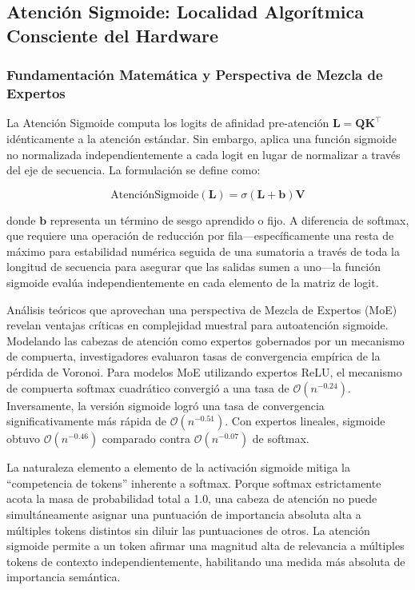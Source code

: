 \documentclass[11pt,a4paper]{article}
\begin{document}
\subsection{Atención Sigmoide: Localidad Algorítmica Consciente del Hardware}

\subsubsection{Fundamentación Matemática y Perspectiva de Mezcla de Expertos}

La Atención Sigmoide computa los logits de afinidad pre-atención $\mathbf{L} = \mathbf{Q}\mathbf{K}^\top$ idénticamente a la atención estándar. Sin embargo, aplica una función sigmoide no normalizada independientemente a cada logit en lugar de normalizar a través del eje de secuencia. La formulación se define como:

$$
\text{AtenciónSigmoide}(\mathbf{L}) = \sigma(\mathbf{L} + \mathbf{b}) \mathbf{V}
$$

donde $\mathbf{b}$ representa un término de sesgo aprendido o fijo. A diferencia de softmax, que requiere una operación de reducción por fila---específicamente una resta de máximo para estabilidad numérica seguida de una sumatoria a través de toda la longitud de secuencia para asegurar que las salidas sumen a uno---la función sigmoide evalúa independientemente en cada elemento de la matriz de logit.

Análisis teóricos que aprovechan una perspectiva de Mezcla de Expertos (MoE) revelan ventajas críticas en complejidad muestral para autoatención sigmoide. Modelando las cabezas de atención como expertos gobernados por un mecanismo de compuerta, investigadores evaluaron tasas de convergencia empírica de la pérdida de Voronoi. Para modelos MoE utilizando expertos ReLU, el mecanismo de compuerta softmax cuadrático convergió a una tasa de $\mathcal{O}(n^{-0.24})$. Inversamente, la versión sigmoide logró una tasa de convergencia significativamente más rápida de $\mathcal{O}(n^{-0.51})$. Con expertos lineales, sigmoide obtuvo $\mathcal{O}(n^{-0.46})$ comparado contra $\mathcal{O}(n^{-0.07})$ de softmax.

La naturaleza elemento a elemento de la activación sigmoide mitiga la ``competencia de tokens'' inherente a softmax. Porque softmax estrictamente acota la masa de probabilidad total a 1.0, una cabeza de atención no puede simultáneamente asignar una puntuación de importancia absoluta alta a múltiples tokens distintos sin diluir las puntuaciones de otros. La atención sigmoide permite a un token afirmar una magnitud alta de relevancia a múltiples tokens de contexto independientemente, habilitando una medida más absoluta de importancia semántica.
\end{document}
